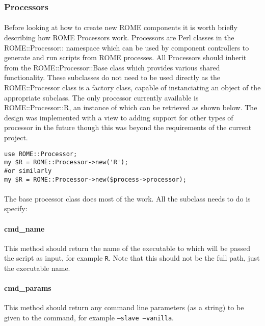 \subsubsection{Processors}
\label{sec:model_processors}

\paragraph{}
Before looking at how to create new ROME components it is worth briefly describing how ROME Processors work. Processors are Perl classes in the ROME::Processor:: namespace which can be used by component controllers to generate and run scripts from ROME processes. All Processors should inherit from the ROME::Processor::Base class which provides various shared functionality. These subclasses do not need to be used directly as the ROME::Processor class is a factory class, capable of instanciating an object of the appropriate subclass. The only processor currently available is ROME::Processor::R, an instance of which can be retrieved as shown below. The design was implemented with a view to adding support for other types of processor in the future though this was beyond the requirements of the current project.

\begin{scriptsize}
\begin{verbatim}
use ROME::Processor;
my $R = ROME::Processor->new('R');
#or similarly
my $R = ROME::Processor->new($process->processor);
\end{verbatim}
\end{scriptsize}

\paragraph{}
The base processor class does most of the work. All the subclass needs to do is specify:

\paragraph{cmd\_name}
This method should return the name of the executable to which will be passed the script as input, for example \texttt{R}. Note that this should not be the full path, just the executable name.

\paragraph{cmd\_params}
This method should return any command line parameters (as a string) to be given to the command, for example \texttt{--slave --vanilla}.

